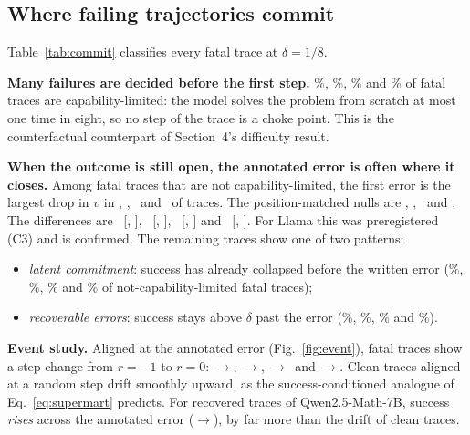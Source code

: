 \subsection{Where failing trajectories commit}
Table~\ref{tab:commit} classifies every fatal trace at $\delta=1/8$.

\textbf{Many failures are decided before the first step.} \QwenSmallAllCapPct\%, \QwenTwoAllCapPct\%,
\QwenMathCapPct\% and \LlamaCapPct\% of fatal traces are capability-limited: the model solves the
problem from scratch at most one time in eight, so no step of the trace is a choke point. This is
the counterfactual counterpart of Section~4's difficulty result.

\textbf{When the outcome is still open, the annotated error is often where it closes.} Among fatal
traces that are not capability-limited, the first error is the largest drop in $v$ in
\QwenSmallAllDec, \QwenTwoAllDec, \QwenMathDec\ and \LlamaDec\ of traces. The position-matched nulls
are \QwenSmallAllDecNull, \QwenTwoAllDecNull, \QwenMathDecNull\ and \LlamaDecNull. The differences
are \QwenSmallAllDecMinusNull\ [\QwenSmallAllDecMinusNullLo, \QwenSmallAllDecMinusNullHi],
\QwenTwoAllDecMinusNull\ [\QwenTwoAllDecMinusNullLo, \QwenTwoAllDecMinusNullHi],
\QwenMathDecMinusNull\ [\QwenMathDecMinusNullLo, \QwenMathDecMinusNullHi] and
\LlamaDecMinusNull\ [\LlamaDecMinusNullLo, \LlamaDecMinusNullHi]. For Llama this was preregistered
(C3) and is confirmed. The remaining traces show one of two patterns:
\begin{itemize}
\item \emph{latent commitment}: success has already collapsed before the written error
(\QwenSmallAllLatentNL\%, \QwenTwoAllLatentNL\%, \QwenMathLatentNL\% and \LlamaLatentNL\% of
not-capability-limited fatal traces);
\item \emph{recoverable errors}: success stays above $\delta$ past the error
(\QwenSmallAllRecovNL\%, \QwenTwoAllRecovNL\%, \QwenMathRecovNL\% and \LlamaRecovNL\%).
\end{itemize}

\textbf{Event study.} Aligned at the annotated error (Fig.~\ref{fig:event}), fatal traces show a step
change from $r=-1$ to $r=0$:
\QwenSmallAllEvFatBefore$\to$\QwenSmallAllEvFatAfter,
\QwenTwoAllEvFatBefore$\to$\QwenTwoAllEvFatAfter,
\QwenMathEvFatBefore$\to$\QwenMathEvFatAfter\ and \LlamaEvFatBefore$\to$\LlamaEvFatAfter. Clean
traces aligned at a random step drift smoothly upward, as the success-conditioned analogue of
Eq.~\ref{eq:supermart} predicts. For recovered traces of Qwen2.5-Math-7B, success \emph{rises}
across the annotated error (\QwenMathEvRecBefore$\to$\QwenMathEvRecAfter), by far more than the
drift of clean traces.

